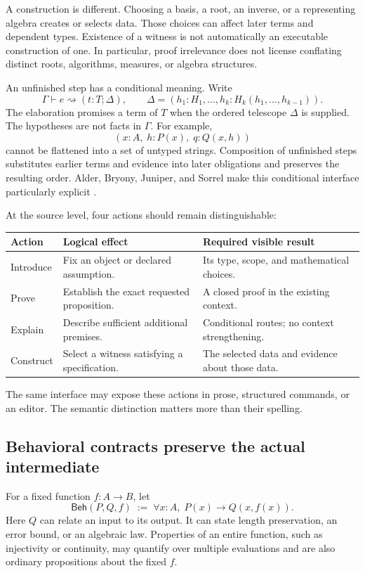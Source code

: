 \documentclass[11pt,letterpaper]{article}
\newcommand{\Beh}{\mathsf{Beh}}\newcommand{\Spec}{\mathsf{Spec}}
\theoremstyle{definition}\newtheorem{definition}[proposition]{Definition}
\theoremstyle{remark}\newtheorem{remark}[proposition]{Remark}
\begin{document}
A construction is different. Choosing a basis, a root, an inverse, or a
representing algebra creates or selects data. Those choices can affect later
terms and dependent types. Existence of a witness is not automatically an
executable construction of one. In particular, proof irrelevance does not
license conflating distinct roots, algorithms, measures, or algebra structures.

An unfinished step has a conditional meaning. Write
\[
 \Gamma\vdash e\rightsquigarrow(t:T;\Delta),\qquad
 \Delta=(h_1:H_1,\ldots,h_k:H_k(h_1,\ldots,h_{k-1})).
\]
The elaboration promises a term of $T$ when the ordered telescope $\Delta$
is supplied. The hypotheses are not facts in $\Gamma$. For example,
\[
 (x:A,\;h:P(x),\;q:Q(x,h))
\]
cannot be flattened into a set of untyped strings. Composition of unfinished
steps substitutes earlier terms and evidence into later obligations and
preserves the resulting order. Alder, Bryony, Juniper, and Sorrel make this
conditional interface particularly explicit \cite{alder,bryony,juniper,sorrel}.

At the source level, four actions should remain distinguishable:
\begin{center}\small
\begin{tabularx}{\textwidth}{@{}P{0.16\textwidth}Y Y@{}}
\toprule Action & Logical effect & Required visible result\\\midrule
Introduce & Fix an object or declared assumption. & Its type, scope, and mathematical choices.\\
Prove & Establish the exact requested proposition. & A closed proof in the existing context.\\
Explain & Describe sufficient additional premises. & Conditional routes; no context strengthening.\\
Construct & Select a witness satisfying a specification. & The selected data and evidence about those data.\\
\bottomrule
\end{tabularx}
\end{center}
The same interface may expose these actions in prose, structured commands,
or an editor. The semantic distinction matters more than their spelling.

\subsection{Behavioral contracts preserve the actual intermediate}

For a fixed function $f:A\to B$, let
\[
 \Beh(P,Q,f)\;:=\;\forall x:A,\;P(x)\to Q(x,f(x)).
\]
Here $Q$ can relate an input to its output. It can state length preservation,
an error bound, or an algebraic law. Properties of an entire function, such as
injectivity or continuity, may quantify over multiple evaluations and are
also ordinary propositions about the fixed $f$.
\end{document}
